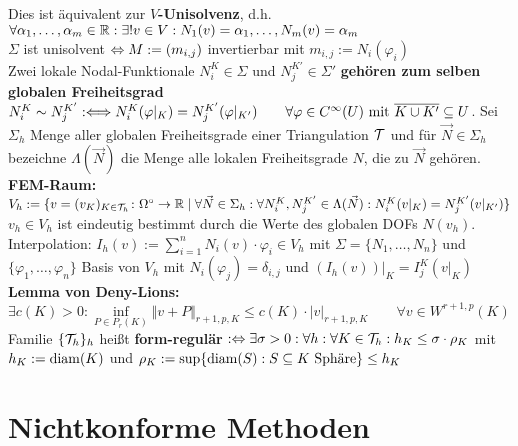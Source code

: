 \documentclass[12pt]{scrartcl}
\begin{document}
	Dies ist äquivalent zur \textbf{$V$-Unisolvenz}, d.h. $\forall\alpha_1,\ldots,\alpha_m\in\R:\exists! v\in V:N_1(v)=\alpha_1,\ldots,N_m(v)=\alpha_m$\\
	$\Sigma$ ist unisolvent $\gdw M:=(m_{i,j})$ invertierbar mit $m_{i,j}:=N_i(\varphi_i)$\\
	Zwei lokale Nodal-Funktionale $N_i^K\in\Sigma$ und $N_j^{K'}\in\Sigma'$ \textbf{gehören zum selben globalen Freiheitsgrad} $N_i^K\sim N_j^{K'}:\Longleftrightarrow N_i^K(\varphi|_K)=N_j^{K'}(\varphi|_{K'})\qquad\forall\varphi\in C^\infty(U)\mit\overline{K\cup K'}\subseteq U$.
	Sei $\Sigma_h$ Menge aller globalen Freiheitsgrade einer Triangulation $\T$ und für $\vec{N}\in\Sigma_h$ bezeichne $\Lambda(\vec{N})$ die Menge alle lokalen Freiheitsgrade $N$, die zu $\vec{N}$ gehören.\\
	\textbf{FEM-Raum:} $V_h:=\lbrace v=(v_{K})_{K\in\T_h}\colon\Omega^\circ\to\R\mid \forall \vec{N}\in\Sigma_h:\forall N_i^{K},N_j^{K'}\in\Lambda(\vec{N}):N_i^{K}(v|_K)=N_j^{K'}(v|_{K'})\rbrace$\\
	$v_h\in V_h$ ist eindeutig bestimmt durch die Werte des globalen DOFs $N(v_h)$.\\
	Interpolation: $I_h(v):=\sum\limits_{i=1}^n N_i(v)\cdot\varphi_i\in V_h$ mit $\Sigma=\lbrace N_1,\ldots,N_n\rbrace$ und $\lbrace\varphi_1,\ldots,\varphi_n\rbrace$ Basis von $V_h$ mit $N_i(\varphi_j)=\delta_{i,j}$ und $(I_h(v))|_K=I_j^K(v|_K)$\\
	\textbf{Lemma von Deny-Lions:} $\exists c(K)>0:\inf\limits_{P\in P_r(K)}\Vert v+P\Vert_{r+1,p,K}\leq c(K)\cdot |v|_{r+1,p,K}\qquad\forall v\in W^{r+1,p}(K)$\\
	Familie $\lbrace\T_h\rbrace_h$ heißt \textbf{form-regulär} $:\gdw\exists\sigma>0:\forall h:\forall K\in\T_h:h_K\leq\sigma\cdot \rho_K$ mit $h_K:=\diam(K)$ und $\rho_K:=\sup\lbrace\diam(S):S\subseteq K\text{ Sphäre}\rbrace\leq h_K$
	
	\section{Nichtkonforme Methoden}
	
\end{document}
